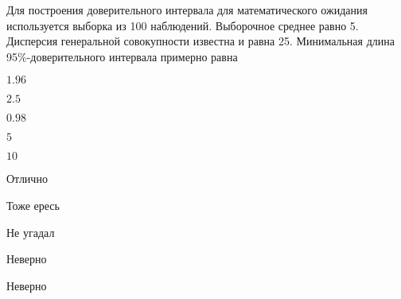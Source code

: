 
\begin{question}
Для построения доверительного интервала для математического ожидания
используется выборка из 100 наблюдений. Выборочное среднее равно 5.
Дисперсия генеральной совокупности известна и равна 25. Минимальная
длина 95\%-доверительного интервала примерно равна
\begin{answerlist}
  \item \(1.96\)
  \item \(2.5\)
  \item \(0.98\)
  \item \(5\)
  \item \(10\)
\end{answerlist}
\end{question}

\begin{solution}
\begin{answerlist}
  \item Отлично
  \item Тоже ересь
  \item Не угадал
  \item Неверно
  \item Неверно
\end{answerlist}
\end{solution}

